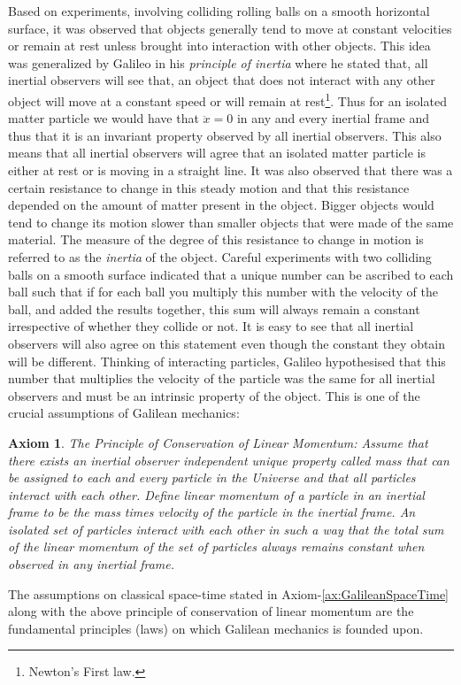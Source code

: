 \documentclass[graybox,envcountchap,sectrefs]{svmonoMuga}
\newtheorem{axiom}{Axiom}[chapter]
\begin{document}
Based on experiments, involving colliding rolling balls on a smooth horizontal surface, it was observed that objects generally tend to move at constant velocities or remain at rest 
unless brought into interaction with other objects. This idea was generalized by Galileo in his \emph{principle of inertia} where he stated that, all inertial observers will see that, an object that does not interact with any other 
object will move at a constant speed or will remain at rest\footnote{Newton's First law.}. Thus for an isolated matter particle we would have that $\ddot{x}=0$ in any and every inertial frame and thus that it is an invariant property observed by all inertial observers. This also means that all inertial observers will agree that an isolated matter particle is either at rest or is moving in a straight line. It was also observed that there was a certain resistance to change in this steady motion and that this resistance depended on the amount of matter present in the object. Bigger objects would tend to change its motion slower than smaller objects that were made of the same material. The measure of the degree of this resistance to change in 
motion is referred to as the \textit{inertia} of the object. Careful experiments with two colliding balls on a smooth surface indicated that a unique number can be ascribed to each ball such that if for each ball you multiply this number with the velocity of the ball, and added the results together, this sum will always remain a constant irrespective of whether they collide or not. It is easy to see that all inertial observers will also agree on this statement even though the constant they obtain will be different. Thinking of interacting particles, Galileo hypothesised that this number that multiplies the velocity of the particle was the same for all inertial observers and must be an intrinsic property of the object.  This is one of the crucial assumptions of Galilean mechanics:

\begin{svgraybox}
\begin{axiom}{\sf The Principle of Conservation of Linear Momentum:} 
Assume that there exists an inertial observer independent unique property called mass that can be assigned to each and every particle in the Universe and that all particles interact with each other. Define {linear momentum} of a particle in an inertial frame to be the mass times velocity of the particle in the inertial frame. An isolated set of particles interact with each other in such a way that the total sum of the linear momentum of the set of particles always remains constant when observed in any inertial frame. 
\end{axiom}
\end{svgraybox}
\noindent The assumptions on classical space-time stated in Axiom-\ref{ax:GalileanSpaceTime} along with the above principle of conservation of linear momentum are the fundamental principles (laws) on which Galilean mechanics is founded upon. 
\end{document}
